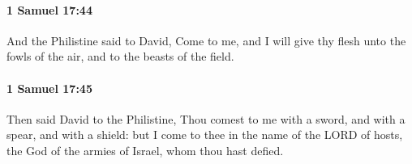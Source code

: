 		\paragraph{1 Samuel 17:44} %
			\label{1SAMUEL-17-44}

			And the Philistine said to David, Come to me, and I will give thy flesh unto the fowls of the air, and to the beasts of the field.


		\paragraph{1 Samuel 17:45} %
			\label{1SAMUEL-17-45}

			Then said David to the Philistine, Thou comest to me with a sword, and with a spear, and with a shield: but I come to thee in the name of the LORD of hosts, the God of the armies of Israel, whom thou hast defied.


